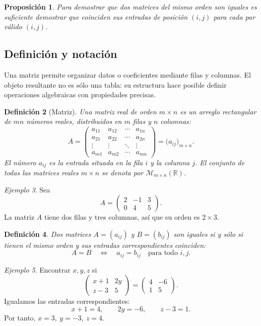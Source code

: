 \documentclass[12pt]{article}
\newtheorem{definicion}{Definición}[section]
\newtheorem{proposicion}[definicion]{Proposición}
\theoremstyle{remark}
\newtheorem{ejemplo}[definicion]{Ejemplo}
\newcommand{\R}{\mathbb{R}}
\newcommand{\Mat}[2]{\mathcal{M}_{#1\times #2}}
\begin{document}
\begin{proposicion}
Para demostrar que dos matrices del mismo orden son iguales es suficiente demostrar que coinciden sus entradas de posición $(i,j)$ para cada par válido $(i,j)$.
\end{proposicion}
\subsection*{Definición y notación}
Una matriz permite organizar datos o coeficientes mediante filas y columnas. El objeto resultante no es sólo una tabla: su estructura hace posible definir operaciones algebraicas con propiedades precisas.

\begin{definicion}[Matriz]
Una \emph{matriz real de orden $m\times n$} es un arreglo rectangular de $mn$ números reales, distribuidos en $m$ filas y $n$ columnas:
\[
A=\begin{pmatrix}
a_{11}&a_{12}&\cdots&a_{1n}\\
a_{21}&a_{22}&\cdots&a_{2n}\\
\vdots&\vdots&\ddots&\vdots\\
a_{m1}&a_{m2}&\cdots&a_{mn}
\end{pmatrix}=\bigl(a_{ij}\bigr)_{m\times n}.
\]
El número $a_{ij}$ es la entrada situada en la fila $i$ y la columna $j$. El conjunto de todas las matrices reales $m\times n$ se denota por $\Mat{m}{n}(\R)$.
\end{definicion}

\begin{ejemplo}
Sea
\[
A=\begin{pmatrix}2&-1&3\\0&4&5\end{pmatrix}.
\]
La matriz $A$ tiene dos filas y tres columnas, así que su orden es $2\times3$. \end{ejemplo}

\begin{definicion}
Dos matrices $A=(a_{ij})$ y $B=(b_{ij})$ son iguales si y sólo si tienen el mismo orden y sus entradas correspondientes coinciden:
\[
A=B\quad\Longleftrightarrow\quad a_{ij}=b_{ij}\quad\text{para todo }i,j.
\]
\end{definicion}

\begin{ejemplo}
Encontrar $x,y,z$ si
\[
\begin{pmatrix}x+1&2y\\z-3&5\end{pmatrix}=
\begin{pmatrix}4&-6\\1&5\end{pmatrix}.
\]
Igualamos las entradas correspondientes:
\[
x+1=4,\qquad 2y=-6,\qquad z-3=1.
\]
Por tanto, $\boxed{x=3,\ y=-3,\ z=4}$.
\end{ejemplo}
\end{document}
